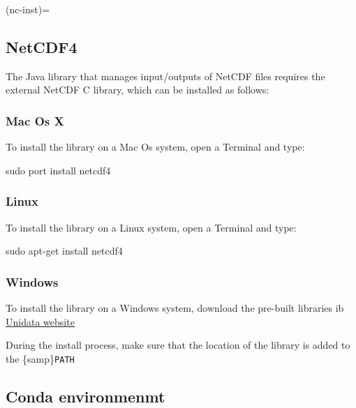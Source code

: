 \documentclass[
  letterpaper,
  DIV=11,
  numbers=noendperiod]{scrreprt}
\newenvironment{Shaded}{\begin{snugshade}}{\end{snugshade}}
\newcommand{\FunctionTok}[1]{\textcolor[rgb]{0.28,0.35,0.67}{#1}}
\newcommand{\NormalTok}[1]{\textcolor[rgb]{0.00,0.23,0.31}{#1}}
\begin{document}
(nc-inst)=

\subsection{NetCDF4}\label{netcdf4}

The Java library that manages input/outputs of NetCDF files requires the
external NetCDF C library, which can be installed as follows:

\subsubsection{Mac Os X}\label{mac-os-x}

To install the library on a Mac Os system, open a Terminal and type:

\begin{Shaded}
\begin{Highlighting}[]
\FunctionTok{sudo}\NormalTok{ port install netcdf4}
\end{Highlighting}
\end{Shaded}

\subsubsection{Linux}\label{linux}

To install the library on a Linux system, open a Terminal and type:

\begin{Shaded}
\begin{Highlighting}[]
\FunctionTok{sudo}\NormalTok{ apt{-}get install netcdf4}
\end{Highlighting}
\end{Shaded}

\subsubsection{Windows}\label{windows}

To install the library on a Windows system, download the pre-built
libraries ib
\href{https://docs.unidata.ucar.edu/netcdf-c/current/winbin.html}{Unidata
website}

During the install process, make sure that the location of the library
is added to the \{samp\}\texttt{PATH}

\subsection{Conda environmenmt}\label{conda-environmenmt}
\end{document}
